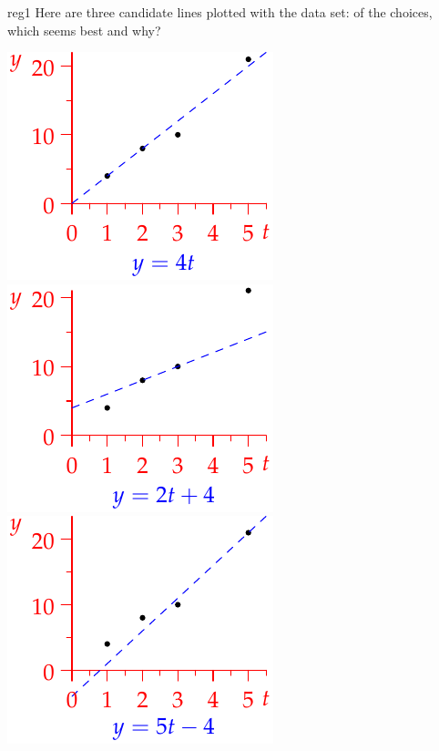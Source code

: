 \begin{example}{}{reg1}
	Here are three candidate lines plotted with the data set: of the choices, which seems best and why?
	\begin{center}
		\hfill
		\includegraphics{reg-line2-1}
		\hfill
		\includegraphics{reg-line2-2}
		\hfill
		\includegraphics{reg-line2-3}
		\hspace*{\fill}
	\end{center}


\end{example}
